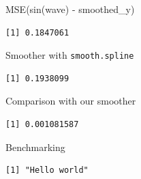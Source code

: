 \documentclass[
  ignorenonframetext,
]{beamer}
\begin{document}
\begin{frame}[fragile]{MSE(sin(wave) - smoothed\_y)}
\protect\hypertarget{msesinwave---smoothed_y}{}
\begin{verbatim}
[1] 0.1847061
\end{verbatim}
\end{frame}

\begin{frame}[fragile]{Smoother with \texttt{smooth.spline}}
\protect\hypertarget{smoother-with-smooth.spline}{}
\begin{verbatim}
[1] 0.1938099
\end{verbatim}
\end{frame}

\begin{frame}[fragile]{Comparison with our smoother}
\protect\hypertarget{comparison-with-our-smoother}{}
\begin{verbatim}
[1] 0.001081587
\end{verbatim}
\end{frame}

\begin{frame}[fragile]{Benchmarking}
\protect\hypertarget{benchmarking}{}
\begin{verbatim}
[1] "Hello world"
\end{verbatim}
\end{frame}
\end{document}
